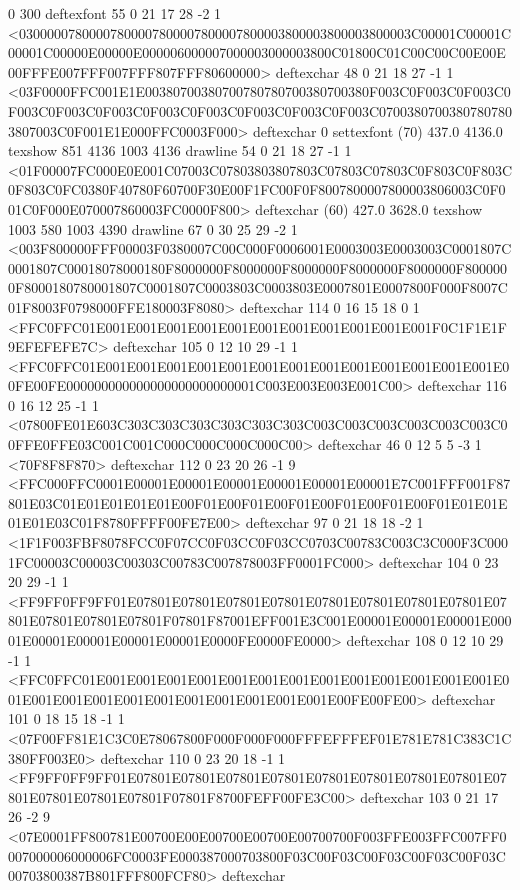 0 300 deftexfont
55 0 21 17 28 -2 1 {{<03000007800007800007800007800007800003800003800003800003C00001C00001C00001C00000E00000E000006000007000003000003800C01800C01C00C00C00E00E00FFFE007FFF007FFF807FFF80600000>}} deftexchar
48 0 21 18 27 -1 1 {{<03F0000FFC001E1E00380700380700780780700380700380F003C0F003C0F003C0F003C0F003C0F003C0F003C0F003C0F003C0F003C0F003C07003807003807807803807003C0F001E1E000FFC0003F000>}} deftexchar
0 settexfont
(70) 437.0 4136.0 texshow
851 4136 1003 4136 drawline
54 0 21 18 27 -1 1 {{<01F00007FC000E0E001C07003C07803803807803C07803C07803C0F803C0F803C0F803C0FC0380F40780F60700F30E00F1FC00F0F8007800007800003806003C0F001C0F000E070007860003FC0000F800>}} deftexchar
(60) 427.0 3628.0 texshow
1003 580 1003 4390 drawline
67 0 30 25 29 -2 1 {{<003F800000FFF00003F0380007C00C000F0006001E0003003E0003003C0001807C0001807C00018078000180F8000000F8000000F8000000F8000000F8000000F8000000F8000180780001807C0001807C0003803C0003803E0007801E0007800F000F8007C01F8003F0798000FFE180003F8080>}} deftexchar
114 0 16 15 18 0 1 {{<FFC0FFC01E001E001E001E001E001E001E001E001E001E001E001F0C1F1E1F9EFEFEFE7C>}} deftexchar
105 0 12 10 29 -1 1 {{<FFC0FFC01E001E001E001E001E001E001E001E001E001E001E001E001E001E00FE00FE000000000000000000000000001C003E003E003E001C00>}} deftexchar
116 0 16 12 25 -1 1 {{<07800FE01E603C303C303C303C303C303C303C003C003C003C003C003C003C00FFE0FFE03C001C001C000C000C000C000C00>}} deftexchar
46 0 12 5 5 -3 1 {{<70F8F8F870>}} deftexchar
112 0 23 20 26 -1 9 {{<FFC000FFC0001E00001E00001E00001E00001E00001E00001E7C001FFF001F87801E03C01E01E01E01E01E00F01E00F01E00F01E00F01E00F01E00F01E01E01E01E01E03C01F8780FFFF00FE7E00>}} deftexchar
97 0 21 18 18 -2 1 {{<1F1F003FBF8078FCC0F07CC0F03CC0F03CC0703C00783C003C3C000F3C0001FC00003C00003C00303C00783C007878003FF0001FC000>}} deftexchar
104 0 23 20 29 -1 1 {{<FF9FF0FF9FF01E07801E07801E07801E07801E07801E07801E07801E07801E07801E07801E07801E07801F07801F87001EFF001E3C001E00001E00001E00001E00001E00001E00001E00001E00001E0000FE0000FE0000>}} deftexchar
108 0 12 10 29 -1 1 {{<FFC0FFC01E001E001E001E001E001E001E001E001E001E001E001E001E001E001E001E001E001E001E001E001E001E001E001E001E00FE00FE00>}} deftexchar
101 0 18 15 18 -1 1 {{<07F00FF81E1C3C0E78067800F000F000F000FFFEFFFEF01E781E781C383C1C380FF003E0>}} deftexchar
110 0 23 20 18 -1 1 {{<FF9FF0FF9FF01E07801E07801E07801E07801E07801E07801E07801E07801E07801E07801E07801E07801F07801F8700FEFF00FE3C00>}} deftexchar
103 0 21 17 26 -2 9 {{<07E0001FF800781E00700E00E00700E00700E00700700F003FFE003FFC007FF0007000006000006FC0003FE000387000703800F03C00F03C00F03C00F03C00F03C00703800387B801FFF800FCF80>}} deftexchar
